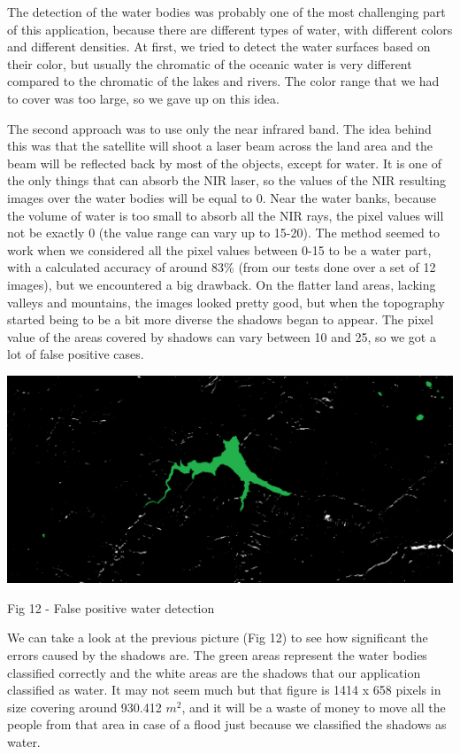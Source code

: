 \documentclass[12pt, a4paper]{report}
\begin{document}
The detection of the water bodies was probably one of the most challenging part of this application, because there are different types of water, with different colors and different densities. At first, we tried to detect the water surfaces based on their color, but usually the chromatic of the oceanic water is very different compared to the chromatic of the lakes and rivers. The color range that we had to cover was too large, so we gave up on this idea. 
\par 
The second approach was to use only the near infrared band. The idea behind this was that the satellite will shoot a laser beam across the land area and the beam will be reflected back by most of the objects, except for water. It is one of the only things that can absorb the NIR laser, so the values of the NIR resulting images over the water bodies will be equal to 0. Near the water banks, because the volume of water is too small to absorb all the NIR rays, the pixel values will not be exactly 0 (the value range can vary up to 15-20). The method seemed to work when we considered all the pixel values between 0-15 to be a water part, with a calculated accuracy of around 83\% (from our tests done over a set of 12 images), but we encountered a big drawback. On the flatter land areas, lacking valleys and mountains, the images looked pretty good, but when the topography started being to be a bit more diverse the shadows began to appear. The pixel value of the areas covered by shadows can vary between 10 and 25, so we got a lot of false positive cases.

\bigskip
\includegraphics[scale=0.4, left]{water-false-positive.png}
\begin{center}
Fig 12 - False positive water detection
\end{center}
\par 

We can take a look at the previous picture (Fig 12) to see how significant the errors caused by the shadows are. The green areas represent the water bodies classified correctly and the white areas are the shadows that our application classified as water. It may not seem much but that figure is 1414 x 658 pixels in size covering around 930.412 $m^2$, and it will be a waste of money to move all the people from that area in case of a flood just because we classified the shadows as water.
\par 
\end{document}
